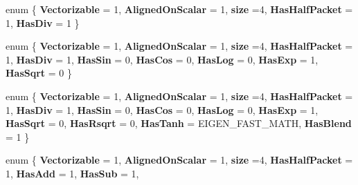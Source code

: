 \begin{DoxyCompactItemize}
\mbox{\label{struct_eigen_1_1internal_1_1packet__traits_3_01float_01_4_a79b7ab5dfad386a3b853b8864e5651eb}} 
enum \{ \newline
{\bfseries Vectorizable} = 1, 
{\bfseries Aligned\+On\+Scalar} = 1, 
{\bfseries size} =4, 
{\bfseries Has\+Half\+Packet} = 1, 
\newline
{\bfseries Has\+Div} = 1
 \}
\item 
\mbox{\label{struct_eigen_1_1internal_1_1packet__traits_3_01float_01_4_a9b51170164eb4a2a47e3d832bb6d6f2a}} 
enum \{ \newline
{\bfseries Vectorizable} = 1, 
{\bfseries Aligned\+On\+Scalar} = 1, 
{\bfseries size} =4, 
{\bfseries Has\+Half\+Packet} = 1, 
\newline
{\bfseries Has\+Div} = 1, 
{\bfseries Has\+Sin} = 0, 
{\bfseries Has\+Cos} = 0, 
{\bfseries Has\+Log} = 0, 
\newline
{\bfseries Has\+Exp} = 1, 
{\bfseries Has\+Sqrt} = 0
 \}
\item 
\mbox{\label{struct_eigen_1_1internal_1_1packet__traits_3_01float_01_4_a9687a4a6c8476b52396972d5b470d041}} 
enum \{ \newline
{\bfseries Vectorizable} = 1, 
{\bfseries Aligned\+On\+Scalar} = 1, 
{\bfseries size} =4, 
{\bfseries Has\+Half\+Packet} = 1, 
\newline
{\bfseries Has\+Div} = 1, 
{\bfseries Has\+Sin} = 0, 
{\bfseries Has\+Cos} = 0, 
{\bfseries Has\+Log} = 0, 
\newline
{\bfseries Has\+Exp} = 1, 
{\bfseries Has\+Sqrt} = 0, 
{\bfseries Has\+Rsqrt} = 0, 
{\bfseries Has\+Tanh} = E\+I\+G\+E\+N\+\_\+\+F\+A\+S\+T\+\_\+\+M\+A\+TH, 
\newline
{\bfseries Has\+Blend} = 1
 \}
\item 
\mbox{\label{struct_eigen_1_1internal_1_1packet__traits_3_01float_01_4_a3101f112b06dc2ebf93c303daa738394}} 
enum \{ \newline
{\bfseries Vectorizable} = 1, 
{\bfseries Aligned\+On\+Scalar} = 1, 
{\bfseries size} =4, 
{\bfseries Has\+Half\+Packet} = 1, 
\newline
{\bfseries Has\+Add} = 1, 
{\bfseries Has\+Sub} = 1, 

\end{DoxyCompactItemize}
